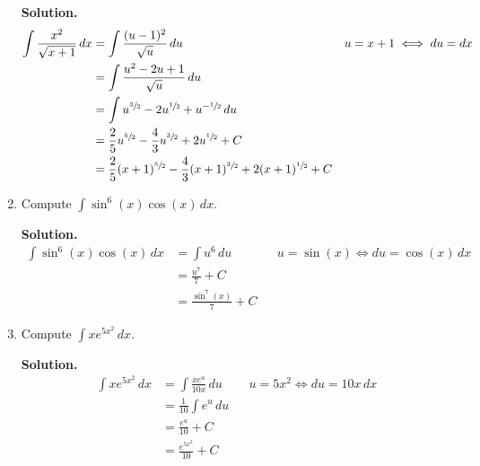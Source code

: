 \begin{Example}{}{}
\begin{enumerate}[label=(\roman*)]
              \textbf{Solution.}
              \begin{align*}
                  \int \frac{x^2}{\sqrt{x+1}} \, d{x}
                   & =\int \frac{(u-1)^2}{\sqrt{u}} \, d{u}                                                     &  & u=x+1\iff du=dx \\
                   & =\int \frac{u^2-2u+1}{\sqrt{u}} \, d{u}                                                                         \\
                   & =\int u^{\sfrac{3}{2}}-2u^{\sfrac{1}{2}}+u^{-\sfrac{1}{2}}\, d{u}                                               \\
                   & =\frac{2}{5} u^{\sfrac{5}{2} }-\frac{4}{3}u^{\sfrac{3}{2}}+2u^{\sfrac{1}{2}}+C                                  \\
                   & =\frac{2}{5} (x+1)^{\sfrac{5}{2} }-\frac{4}{3}(x+1)^{\sfrac{3}{2}}+2(x+1)^{\sfrac{1}{2}}+C
              \end{align*}
        \item Compute
              $ \displaystyle \int \sin^6(x)\cos(x)\, d{x} $.

              \textbf{Solution.}
              \begin{align*}
                  \int \sin^6(x)\cos(x)\, d{x}
                   & =\int u^6\, d{u}        &  & u=\sin(x)\iff du=\cos(x)\,dx \\
                   & =\frac{u^7}{7}+C                                          \\
                   & =\frac{\sin^7(x)}{7} +C
              \end{align*}
        \item Compute $ \displaystyle  \int x e^{5x^2}\, d{x} $.

              \textbf{Solution.}
              \begin{align*}
                  \int x e^{5x^2}\, d{x}
                   & =\int \frac{xe^u}{10x} \, d{u} &  & u=5x^2\iff du=10x\,dx \\
                   & =\frac{1}{10} \int e^u\, d{u}                             \\
                   & =\frac{e^u}{10} +C                                        \\
                   & =\frac{e^{5x^2}}{10} +C
              \end{align*}
    \end{enumerate}
\end{Example}


